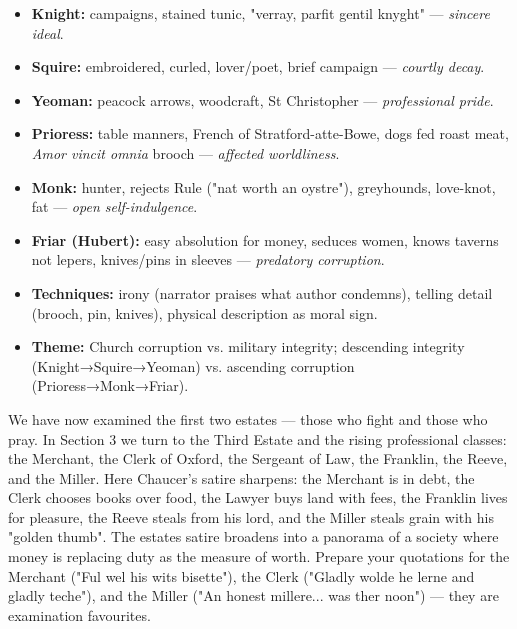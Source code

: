 \documentclass[11pt]{article}
\newcommand{\cle}[1]{{\popxbold\color{popdark}#1}}
\newcounter{popsec}
\newcounter{popsub}
\newcommand{\courssub}[1]{%
  \stepcounter{popsub}%
  \par\vspace{9pt}\noindent{\popxbold\fontsize{11.5}{13}\selectfont\color{popink}{\color{poporange}\thepopsec.\thepopsub}\hspace{6pt}#1}\par\nopagebreak\vspace{4pt}
}
\begin{document}
\begin{aretenir}
\begin{itemize}
\item \textbf{Knight:} campaigns, stained tunic, "verray, parfit gentil knyght" — \emph{sincere ideal}.
\item \textbf{Squire:} embroidered, curled, lover/poet, brief campaign — \emph{courtly decay}.
\item \textbf{Yeoman:} peacock arrows, woodcraft, St Christopher — \emph{professional pride}.
\item \textbf{Prioress:} table manners, French of Stratford-atte-Bowe, dogs fed roast meat, \textit{Amor vincit omnia} brooch — \emph{affected worldliness}.
\item \textbf{Monk:} hunter, rejects Rule ("nat worth an oystre"), greyhounds, love-knot, fat — \emph{open self-indulgence}.
\item \textbf{Friar (Hubert):} easy absolution for money, seduces women, knows taverns not lepers, knives/pins in sleeves — \emph{predatory corruption}.
\item \textbf{Techniques:} irony (narrator praises what author condemns), telling detail (brooch, pin, knives), physical description as moral sign.
\item \textbf{Theme:} Church corruption vs. military integrity; descending integrity (Knight→Squire→Yeoman) vs. ascending corruption (Prioress→Monk→Friar).
\end{itemize}
\end{aretenir}

\courssub{Transition to Section 3}

We have now examined the first two estates — those who fight and those who pray. In Section 3 we turn to the \cle{Third Estate} and the rising professional classes: the \cle{Merchant}, the \cle{Clerk of Oxford}, the \cle{Sergeant of Law}, the \cle{Franklin}, the \cle{Reeve}, and the \cle{Miller}. Here Chaucer's satire sharpens: the Merchant is in debt, the Clerk chooses books over food, the Lawyer buys land with fees, the Franklin lives for pleasure, the Reeve steals from his lord, and the Miller steals grain with his "golden thumb". The \cle{estates satire} broadens into a panorama of a society where \cle{money} is replacing \cle{duty} as the measure of worth. Prepare your quotations for the Merchant ("Ful wel his wits bisette"), the Clerk ("Gladly wolde he lerne and gladly teche"), and the Miller ("An honest millere... was ther noon") — they are examination favourites.
\end{document}
